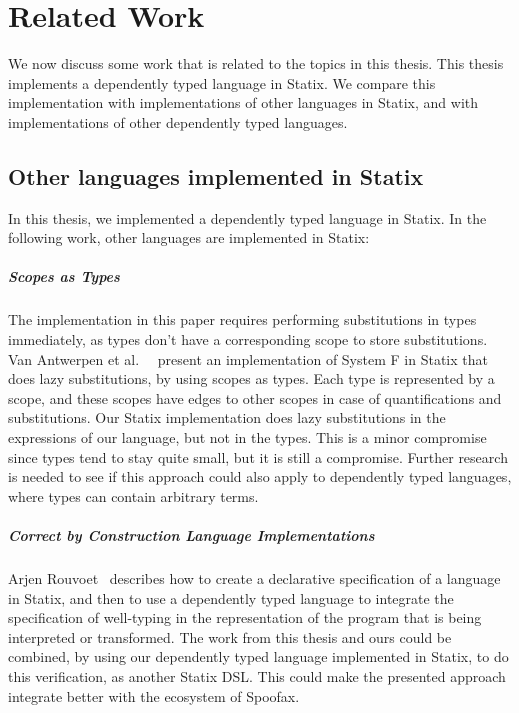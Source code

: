 \chapter{Related Work}
\label{ch:relatedwork}

We now discuss some work that is related to the topics in this thesis. This thesis implements a dependently typed language in Statix. We compare this implementation with implementations of other languages in Statix, and with implementations of other dependently typed languages.

\section{Other languages implemented in Statix}

In this thesis, we implemented a dependently typed language in Statix. In the following work, other languages are implemented in Statix:

\paragraph{Scopes as Types}

The implementation in this paper requires performing substitutions in types immediately, as types don't have a corresponding scope to store substitutions. Van Antwerpen et al.~\cite[sect 2.5]{scopes_as_types}~\cite{nameres} present an implementation of System F in Statix that does lazy substitutions, by using scopes as types. Each type is represented by a scope, and these scopes have edges to other scopes in case of quantifications and substitutions. Our Statix implementation does lazy substitutions in the expressions of our language, but not in the types. This is a minor compromise since types tend to stay quite small, but it is still a compromise. Further research is needed to see if this approach could also apply to dependently typed languages, where types can contain arbitrary terms. 

\paragraph{Correct by Construction Language Implementations}

Arjen Rouvoet~\cite{Rouvoet21} describes how to create a declarative specification of a language in Statix, and then to use a dependently typed language to integrate the specification of well-typing in the representation of the program that is being interpreted or transformed. The work from this thesis and ours could be combined, by using our dependently typed language implemented in Statix, to do this verification, as another Statix DSL. This could make the presented approach integrate better with the ecosystem of Spoofax.

